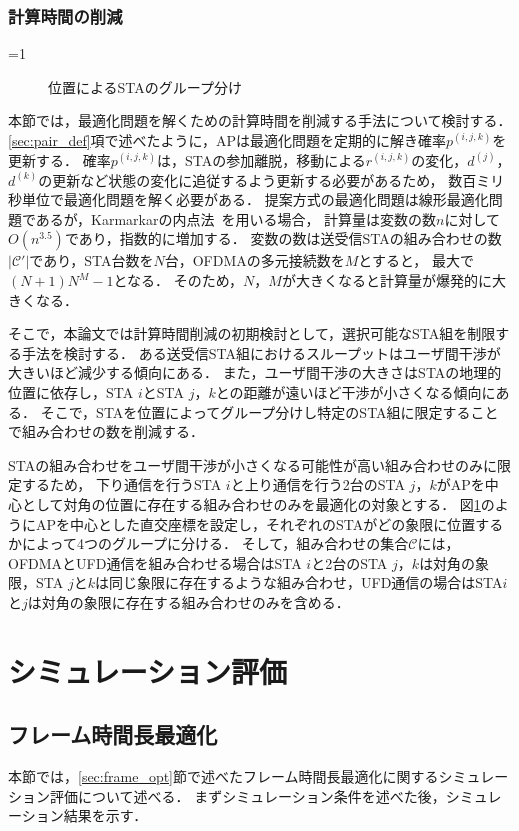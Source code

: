 \documentclass[master]{kuisthesis}		%
\newcommand{\pijk}{p^{(i,j,k)}}
\newcommand{\rijk}{r^{(i,j,k)}}
\newcommand{\mthc}{\mathcal C}
\newcommand{\mthcd}{{\mathcal C}'}
\newcounter{flagFig}
\begin{document}
		\subsubsection{計算時間の削減}\label{sec:time}
			\ifnum\value{flagFig}=1 {\begin{figure}[t]
				\centering
				\caption{位置によるSTAのグループ分け}
				\label{fig:time_image}
			\end{figure}}\fi
			本節では，最適化問題を解くための計算時間を削減する手法について検討する．
			\ref{sec:pair_def}項で述べたように，APは最適化問題を定期的に解き確率$\pijk$を更新する．
			確率$\pijk$は，STAの参加離脱，移動による$\rijk$の変化，$d^{(j)}$，$d^{(k)}$の更新など状態の変化に追従するよう更新する必要があるため，
			数百ミリ秒単位で最適化問題を解く必要がある．
			提案方式の最適化問題は線形最適化問題であるが，Karmarkarの内点法~\cite{karmarkar}を用いる場合，
			計算量は変数の数$n$に対して$O(n^{3.5})$であり，指数的に増加する．
			変数の数は送受信STAの組み合わせの数$|{\mthcd}|$であり，STA台数を$N$台，OFDMAの多元接続数を$M$とすると，
			最大で$(N+1)N^M-1$となる．
			そのため，$N$，$M$が大きくなると計算量が爆発的に大きくなる．
			\par
			そこで，本論文では計算時間削減の初期検討として，選択可能なSTA組を制限する手法を検討する．
			ある送受信STA組におけるスループットはユーザ間干渉が大きいほど減少する傾向にある．
			また，ユーザ間干渉の大きさはSTAの地理的位置に依存し，STA $i$とSTA $j$，$k$との距離が遠いほど干渉が小さくなる傾向にある．
			そこで，STAを位置によってグループ分けし特定のSTA組に限定することで組み合わせの数を削減する．
			\par
			STAの組み合わせをユーザ間干渉が小さくなる可能性が高い組み合わせのみに限定するため，
			下り通信を行うSTA $i$と上り通信を行う2台のSTA $j$，$k$がAPを中心として対角の位置に存在する組み合わせのみを最適化の対象とする．
			図\ref{fig:time_image}のようにAPを中心とした直交座標を設定し，それぞれのSTAがどの象限に位置するかによって4つのグループに分ける．
			そして，組み合わせの集合$\mthc$には，OFDMAとUFD通信を組み合わせる場合はSTA $i$と2台のSTA $j$，$k$は対角の象限，STA $j$と$k$は同じ象限に存在するような組み合わせ，UFD通信の場合はSTA$i$と$j$は対角の象限に存在する組み合わせのみを含める．

\section{シミュレーション評価}
	\subsection{フレーム時間長最適化}
		本節では，\ref{sec:frame_opt}節で述べたフレーム時間長最適化に関するシミュレーション評価について述べる．
		まずシミュレーション条件を述べた後，シミュレーション結果を示す．
\end{document}
